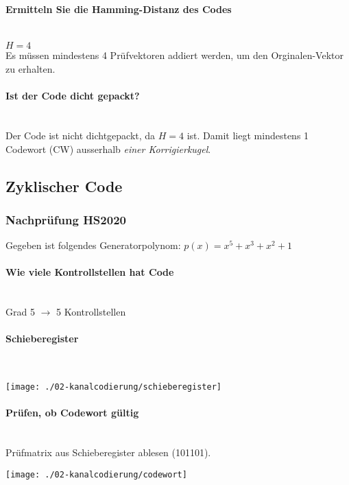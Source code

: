 \paragraph{Ermitteln Sie die Hamming-Distanz des Codes}\mbox{}\\
$H=4$\\
Es müssen mindestens 4 Prüfvektoren addiert werden, um den Orginalen-Vektor zu erhalten.

\paragraph{Ist der Code dicht gepackt?}\mbox{}\\
Der Code ist nicht dichtgepackt, da $H=4$ ist. Damit liegt mindestens 1 Codewort (CW) ausserhalb \textit{einer Korrigierkugel}.


\subsection{Zyklischer Code}
\subsubsection{Nachprüfung HS2020}
Gegeben ist folgendes Generatorpolynom:
$p(x)=x^5+x^3+x^2+1$

\paragraph{Wie viele Kontrollstellen hat Code}\mbox{}\\
Grad 5 $\rightarrow$ 5 Kontrollstellen

\paragraph{Schieberegister}\mbox{}\\
\begin{center}
    \vspace{-8pt}
    \texttt{[image: ./02-kanalcodierung/schieberegister]}
    \vspace{-8pt}
\end{center}

\paragraph{Prüfen, ob Codewort gültig}\mbox{}\\
Prüfmatrix aus Schieberegister ablesen (101101).
\begin{center}
    \vspace{-8pt}
    \texttt{[image: ./02-kanalcodierung/codewort]}
    \vspace{-8pt}
\end{center}

